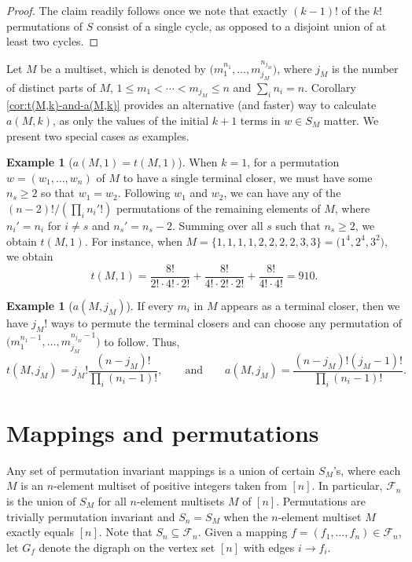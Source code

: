 \documentclass[letterpaper]{amsart}
\theoremstyle{plain}
\theoremstyle{definition}
\newtheorem{example}[theorem]{Example}
\theoremstyle{remark}
\begin{document}
\begin{proof}
The claim readily follows once we note that exactly $(k-1)!$ of the $k!$ permutations of $S$ consist of a single cycle, as opposed to a disjoint union of at least two cycles.
\end{proof}

Let $M$ be a multiset, which is denoted by $\bigl(m_1^{n_1}, \ldots, m_{j_M}^{n_{j_M}}\bigr)$, where $j_M$ is the number of distinct parts of $M$, $1 \leq m_1 < \cdots < m_{j_M} \leq n$ and $\sum_i n_i = n$. Corollary \ref{cor:t(M,k)-and-a(M,k)} provides an alternative (and faster) way to calculate $a(M, k)$, as only the values of the initial $k+1$ terms in $w \in S_M$ matter. We present two special cases as examples.

\begin{example}[{$a(M,1) = t(M,1)$}]
When $k = 1$, for a permutation $w = (w_1, \ldots, w_n)$ of $M$ to have a single terminal closer, we must have some $n_s \geq 2$ so that $w_1 = w_2$.
Following $w_1$ and $w_2$, we can have any of the $(n-2)! / (\prod_i n_i'!)$ permutations of the remaining elements of $M$, where $n_i' = n_i$ for $i \neq s$ and $n_s' = n_s - 2$.
Summing over all $s$ such that $n_s \geq 2$, we obtain $t(M,1)$.
For instance, when $M=\{1,1,1,1,2,2,2,2,3,3\} = \bigl( 1^{4}, 2^{4}, 3^{2} \bigr)$, we obtain
\[
t(M,1) = \frac{8!}{2! \cdot 4! \cdot 2!} + \frac{8!}{4! \cdot 2! \cdot 2!} + \frac{8!}{4! \cdot 4!} = 910.
\]
\end{example}

\begin{example}[{$a(M,j_M)$}]\label{ex}
	If every $m_i$ in $M$ appears as a terminal closer, then we have $j_M!$ ways to permute the terminal closers and can choose any permutation of $\bigl( m_1^{n_1 - 1}, \ldots, m_{j_M}^{n_{j_M} - 1} \bigr)$ to follow. Thus,
	\[
	t(M,j_M) = j_M ! \frac{(n-j_M)!}{\prod_{i} (n_i - 1)!}, \qquad \mbox{and} \qquad a(M,j_M) = \frac{(n-j_M)! (j_M - 1)!}{\prod_i (n_i - 1)!}.
	\]
\end{example}

\section{Mappings and permutations}
\label{sec:mp}

Any set of permutation invariant mappings is a union of certain $S_M$'s, where each $M$ is an $n$-element multiset of positive integers taken from $[n]$. In particular, $\mathcal{F}_n$ is the union of $S_M$ for all $n$-element multisets $M$ of $[n]$.
Permutations are trivially permutation invariant and $S_n=S_M$ when the $n$-element multiset $M$ exactly equals $[n]$. Note that $S_n \subseteq \mathcal{F}_n$. Given a mapping $f= (f_1, \dots, f_n) \in \mathcal{F}_n$, let $G_f$ denote the digraph on the vertex set $[n]$ with edges $i \rightarrow f_i$.
\end{document}
